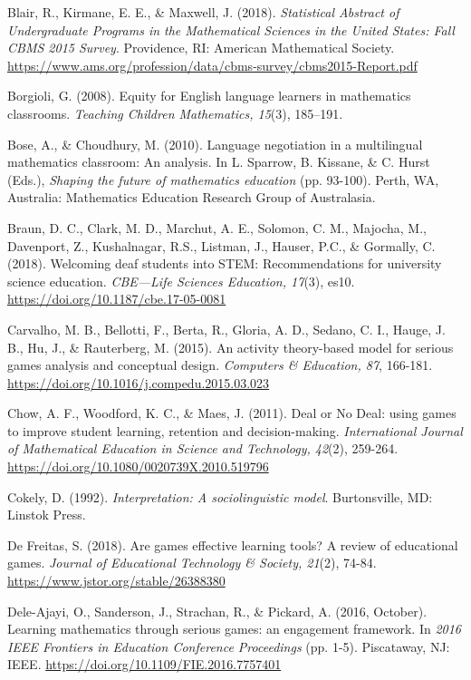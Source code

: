 \documentclass[11.5pt]{sig-alternate} %
\begin{document}
Blair, R., Kirmane, E. E., \& Maxwell, J. (2018). \textit{Statistical Abstract of Undergraduate Programs in the Mathematical Sciences in the United States: Fall CBMS 2015 Survey}. Providence, RI: American Mathematical Society. \url{https://www.ams.org/profession/data/cbms-survey/cbms2015-Report.pdf}

Borgioli, G. (2008). Equity for English language learners in mathematics classrooms. \textit{Teaching Children Mathematics, 15}(3), 185–191.

Bose, A., \& Choudhury, M. (2010). Language negotiation in a multilingual mathematics classroom: An analysis. In L. Sparrow, B. Kissane, \& C. Hurst (Eds.), \textit{Shaping the future of mathematics education} (pp. 93-100). Perth, WA, Australia: Mathematics Education Research Group of Australasia.

Braun, D. C., Clark, M. D., Marchut, A. E., Solomon, C. M., Majocha, M., Davenport, Z., Kushalnagar, R.S., Listman, J., Hauser, P.C., \& Gormally, C. (2018). Welcoming deaf students into STEM: Recommendations for university science education. \textit{CBE—Life Sciences Education, 17}(3), es10. \url{https://doi.org/10.1187/cbe.17-05-0081}

Carvalho, M. B., Bellotti, F., Berta, R., Gloria, A. D., Sedano, C. I., Hauge, J. B., Hu, J., \& Rauterberg, M. (2015). An activity theory-based model for serious games analysis and conceptual design. \textit{Computers \& Education, 87}, 166-181. \url{https://doi.org/10.1016/j.compedu.2015.03.023} 

Chow, A. F., Woodford, K. C., \& Maes, J. (2011). Deal or No Deal: using games to improve student learning, retention and decision-making. \textit{International Journal of Mathematical Education in Science and Technology, 42}(2), 259-264. \url{https://doi.org/10.1080/0020739X.2010.519796}

Cokely, D. (1992). \textit{Interpretation: A sociolinguistic model}. Burtonsville, MD: Linstok Press.

De Freitas, S. (2018). Are games effective learning tools? A review of educational games. \textit{Journal of Educational Technology \& Society, 21}(2), 74-84. \url{https://www.jstor.org/stable/26388380} 

Dele-Ajayi, O., Sanderson, J., Strachan, R., \& Pickard, A. (2016, October). Learning mathematics through serious games: an engagement framework. In \textit{2016 IEEE Frontiers in Education Conference Proceedings} (pp. 1-5). Piscataway, NJ: IEEE. \url{https://doi.org/10.1109/FIE.2016.7757401} 
\end{document}
